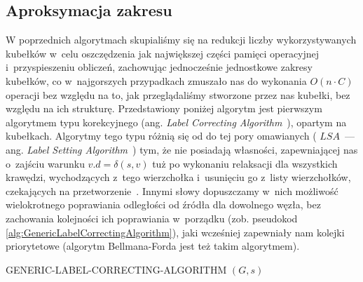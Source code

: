 \subsection{Aproksymacja zakresu}

W poprzednich algorytmach skupialiśmy się na redukcji liczby wykorzystywanych kubełków w~celu oszczędzenia jak największej części pamięci operacyjnej i~przyspieszeniu obliczeń, zachowując jednocześnie jednostkowe zakresy kubełków, co w~najgorszych przypadkach zmuszało nas do wykonania $O \left( n \cdot C \right)$ operacji bez względu na to, jak przeglądaliśmy stworzone przez nas kubełki, bez względu na ich strukturę. Przedstawiony poniżej algorytm jest pierwszym algorytmem typu korekcyjnego (ang. \textit{Label Correcting Algorithm}~\cite[$2.4$]{OR}), opartym na kubełkach. Algorytmy tego typu różnią się od do tej pory omawianych ( $LSA$~--- ang. \textit{Label Setting Algorithm}~\cite[$2.1$]{OR}) tym, że nie posiadają własności, zapewniającej nas o~zajściu warunku $v.d = \delta \left( s, v \right)$ tuż po wykonaniu relaksacji dla wszystkich krawędzi, wychodzących z~tego wierzchołka i~usunięciu go z~listy wierzchołków, czekających na przetworzenie~\cite[$17$]{OR}. Innymi słowy dopuszczamy w~nich możliwość wielokrotnego poprawiania odległości od źródła dla dowolnego węzła, bez zachowania kolejności ich poprawiania w~porządku (zob. pseudokod \ref{alg:GenericLabelCorrectingAlgorithm}), jaki wcześniej zapewniały nam kolejki priorytetowe (algorytm Bellmana-Forda jest też takim algorytmem). 

\begin{pseudokod}[!htbp]
\DontPrintSemicolon
{}
\caption{ GENERIC-LABEL-CORRECTING-ALGORITHM $\left( G, s \right)$\label{alg:GenericLabelCorrectingAlgorithm}}
\end{pseudokod}

